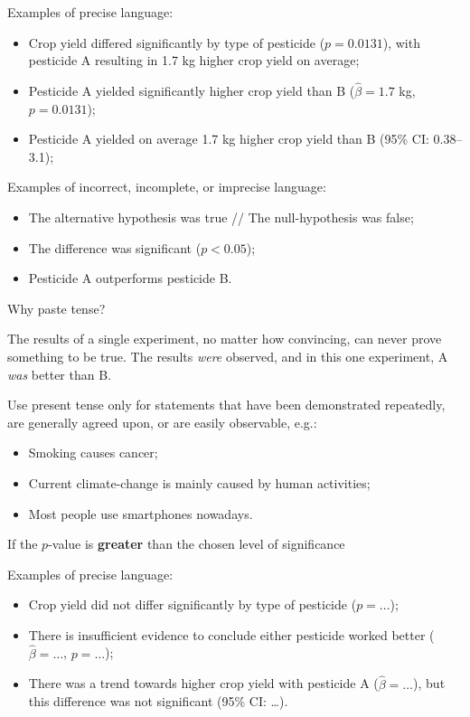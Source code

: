 \documentclass[
]{book}
\providecommand{\tightlist}{%
  \setlength{\itemsep}{0pt}\setlength{\parskip}{0pt}}
\begin{document}
Examples of precise language:

\begin{itemize}
\tightlist
\item
  Crop yield differed significantly by type of pesticide (\(p = 0.0131\)), with pesticide A resulting in 1.7 kg higher crop yield on average;
\item
  Pesticide A yielded significantly higher crop yield than B (\(\hat{\beta} = 1.7\) kg, \(p = 0.0131\));
\item
  Pesticide A yielded on average 1.7 kg higher crop yield than B (95\% CI: 0.38--3.1);
\end{itemize}

Examples of incorrect, incomplete, or imprecise language:

\begin{itemize}
\tightlist
\item
  The alternative hypothesis was true // The null-hypothesis was false;
\item
  The difference was significant (\(p < 0.05\));
\item
  Pesticide A outperforms pesticide B.
\end{itemize}

Why paste tense?

The results of a single experiment, no matter how convincing, can never prove something to be true. The results \emph{were} observed, and in this one experiment, A \emph{was} better than B.

Use present tense only for statements that have been demonstrated repeatedly, are generally agreed upon, or are easily observable, e.g.:

\begin{itemize}
\tightlist
\item
  Smoking causes cancer;
\item
  Current climate-change is mainly caused by human activities;
\item
  Most people use smartphones nowadays.
\end{itemize}

If the \(p\)-value is \textbf{greater} than the chosen level of significance

Examples of precise language:

\begin{itemize}
\tightlist
\item
  Crop yield did not differ significantly by type of pesticide (\(p = \dots\));
\item
  There is insufficient evidence to conclude either pesticide worked better (\(\hat{\beta} = \dots\), \(p = \dots\));
\item
  There was a trend towards higher crop yield with pesticide A (\(\hat{\beta} = \dots\)), but this difference was not significant (95\% CI: \ldots).
\end{itemize}
\end{document}
